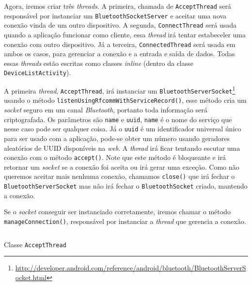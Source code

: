 \documentclass[a4paper,12pt,brazil]{book}
\begin{document}
\begin{singlespace}
	Agora, iremos criar três \emph{threads}. A primeira, chamada de \texttt{AcceptThread} será responsável por instanciar um \texttt{BluetoothSocketServer} e aceitar uma nova conexão vinda de um outro dispositivo. A segunda, \texttt{ConnectThread} será usada quando a aplicação funcionar como cliente, essa \emph{thread} irá tentar estabeceler uma conexão com outro dispositivo. Já a terceira, \texttt{ConnectedThread} será usada em ambos os casos, para gerenciar a conexão e a entrada e saída de dados. Todas essas \emph{threads} estão escritas como classes \emph{inline} (dentro da classe \texttt{DeviceListActivity}).

	A primeira \emph{thread}, \texttt{AcceptThread}, irá instanciar um \texttt{BluetoothServerSocket}\footnote{\href{http://developer.android.com/reference/android/bluetooth/BluetoothServerSocket.html}{http://developer.android.com/reference/android/bluetooth/BluetoothServerSocket.html}}  usando o método \texttt{listenUsingRfcommWithServiceRecord()}, esse método cria um \emph{socket} seguro em um canal \emph{Bluetooth}, portanto toda informação será criptografada. Os parâmetros são \texttt{name} e \texttt{uuid}, \texttt{name} é o nome do serviço que nesse caso pode ser qualquer coisa. Já o \texttt{uuid} é um identificador universal único para ser usado com a aplicação, pode-se obter um número usando geradores aleatórios de UUID disponíveis na \emph{web}. A \emph{thread} irá ficar tentando escutar uma conexão com o método \texttt{accept()}. Note que este método é bloqueante e irá retornar um \emph{socket} se a conexão foi aceita ou irá gerar uma exceção.
Como não queremos aceitar mais nenhuma conexão, chamamos \texttt{close()} que irá fechar o \texttt{BluetoothServerSocket} mas não irá fechar o \texttt{BluetoothSocket} criado, mantendo a conexão.

Se o \emph{socket} conseguir ser instanciado corretamente, iremos chamar o método \texttt{manageConnection()}, responsável por instanciar a \emph{thread} que gerencia a conexão. 

	\begin{listing}[H]
	\inputminted[linenos=true,fontsize=\small,frame=lines, framesep=2mm, tabsize=2,numbersep=5pt]{java}{src/api/bluetooth/acceptthread.java}
	\caption{Classe \texttt{AcceptThread}}
	\label{code:bluetooth-acceptthread}
	\end{listing} 			


\end{singlespace}
\end{document}
